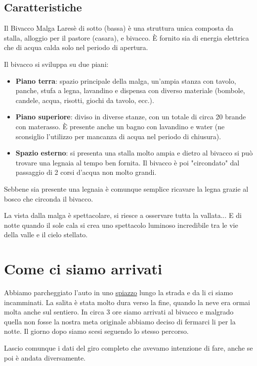 \documentclass{article}
\begin{document}
\subsection{Caratteristiche}
Il Bivacco Malga Laresè di sotto (bassa) è una struttura unica composta da stalla, alloggio per il pastore (casara), e  bivacco. È fornito sia di energia elettrica che di acqua calda solo nel periodo di apertura.

Il bivacco si sviluppa su due piani:
\begin{itemize}
    \item \textbf{Piano terra}: spazio principale della malga, un'ampia stanza con tavolo, panche, stufa a legna, lavandino e dispensa con diverso materiale (bombole, candele, acqua, risotti, giochi da tavolo, ecc.).
    \item \textbf{Piano superiore}: diviso in diverse stanze, con un totale di circa 20 brande con materasso. È presente anche un bagno con lavandino e water (ne sconsiglio l'utilizzo per mancanza di acqua nel periodo di chiusura).
    \item \textbf{Spazio esterno}: si presenta una stalla molto ampia e dietro al bivacco si può trovare una legnaia al tempo ben fornita. Il bivacco è poi "circondato" dal passaggio di 2 corsi d'acqua non molto grandi.
\end{itemize}

Sebbene sia presente una legnaia è comunque semplice ricavare la legna grazie al bosco che circonda il bivacco.

La vista dalla malga è spettacolare, si riesce a osservare tutta la vallata... E di notte quando il sole cala si crea uno spettacolo luminoso incredibile tra le vie della valle e il cielo stellato.

\section{Come ci siamo arrivati}
Abbiamo parcheggiato l'auto in uno \href{https://maps.google.com/?q=46.418194507125875,10.946478177557312}{spiazzo} lungo la strada e da li ci siamo incamminati. La salita è stata molto dura verso la fine, quando la neve era ormai molta anche sul sentiero. In circa 3 ore siamo arrivati al bivacco e malgrado quella non fosse la nostra meta originale abbiamo deciso di fermarci li per la notte. Il giorno dopo siamo scesi seguendo lo stesso percorso.

Lascio comunque i dati del giro completo che avevamo intenzione di fare, anche se poi è andata diversamente.
\end{document}
